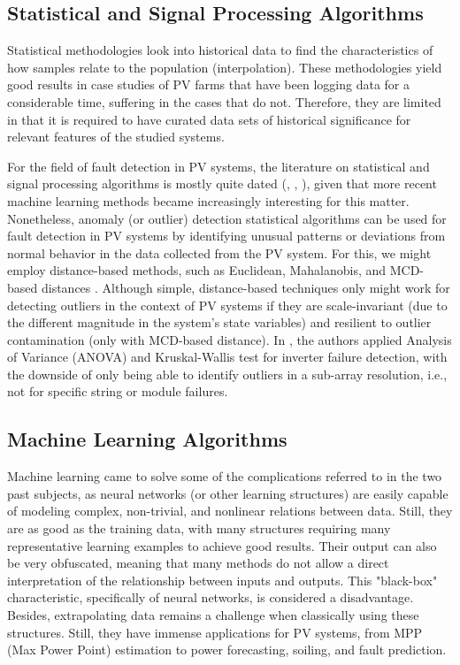 \subsection{Statistical and Signal Processing Algorithms}

Statistical methodologies look into historical data to find the characteristics of how samples relate to the population (interpolation). These methodologies yield good results in case studies of PV farms that have been logging data for a considerable time, suffering in the cases that do not. Therefore, they are limited in that it is required to have curated data sets of historical significance for relevant features of the studied systems.


For the field of fault detection in PV systems, the literature on statistical and signal processing algorithms is mostly quite dated (\cite{Buddha2012}, \cite{Zhao2014}, \cite{Vergura2008}), given that more recent machine learning methods became increasingly interesting for this matter. Nonetheless, anomaly (or outlier) detection statistical algorithms can be used for fault detection in PV systems by identifying unusual patterns or deviations from normal behavior in the data collected from the PV system. For this, we might employ distance-based methods, such as Euclidean, Mahalanobis, and MCD-based distances \cite{Braun2011}. Although simple, distance-based techniques only might work for detecting outliers in the context of PV systems if they are scale-invariant (due to the different magnitude in the system's state variables) and resilient to outlier contamination (only with MCD-based distance). In  \cite{Vergura2008}, the authors applied Analysis of Variance (ANOVA) and Kruskal-Wallis test for inverter failure detection, with the downside of only being able to identify outliers in a sub-array resolution, i.e., not for specific string or module failures.


\subsection{Machine Learning Algorithms}

Machine learning came to solve some of the complications referred to in the two past subjects, as neural networks (or other learning structures) are easily capable of modeling complex, non-trivial, and nonlinear relations between data. Still, they are as good as the training data, with many structures requiring many representative learning examples to achieve good results. Their output can also be very obfuscated, meaning that many methods do not allow a direct interpretation of the relationship between inputs and outputs. This "black-box" characteristic, specifically of neural networks, is considered a disadvantage. Besides, extrapolating data remains a challenge when classically using these structures. Still, they have immense applications for PV systems, from MPP (Max Power Point) estimation to power forecasting, soiling, and fault prediction.

